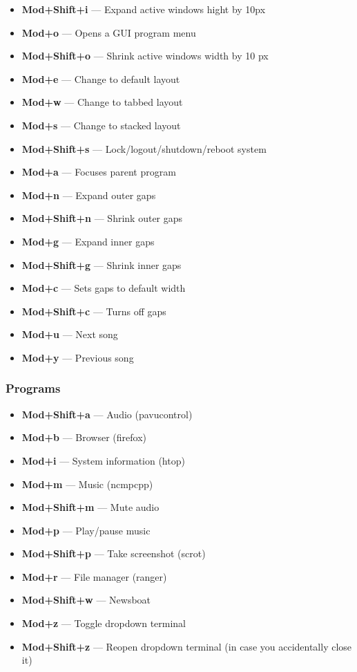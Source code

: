 \documentclass{article}
\begin{document}
\begin{itemize}
	\item \textbf{Mod+Shift+i} --- Expand active windows hight by 10px
	\item \textbf{Mod+o} --- Opens a GUI program menu
	\item \textbf{Mod+Shift+o} --- Shrink active windows width by 10 px
	\item \textbf{Mod+e} --- Change to default layout
	\item \textbf{Mod+w} --- Change to tabbed layout
	\item \textbf{Mod+s} --- Change to stacked layout
	\item \textbf{Mod+Shift+s} --- Lock/logout/shutdown/reboot system
	\item \textbf{Mod+a} --- Focuses parent program
	\item \textbf{Mod+n} --- Expand outer gaps
	\item \textbf{Mod+Shift+n} --- Shrink outer gaps
	\item \textbf{Mod+g} --- Expand inner gaps
	\item \textbf{Mod+Shift+g} --- Shrink inner gaps
	\item \textbf{Mod+c} --- Sets gaps to default width
	\item \textbf{Mod+Shift+c} --- Turns off gaps
	\item \textbf{Mod+u} --- Next song
	\item \textbf{Mod+y} --- Previous song
\end{itemize}

\subsubsection{Programs}
\begin{itemize}
	\item \textbf{Mod+Shift+a} --- Audio (pavucontrol)
	\item \textbf{Mod+b} --- Browser (firefox)
	\item \textbf{Mod+i} --- System information (htop)
	\item \textbf{Mod+m} --- Music (ncmpcpp)
	\item \textbf{Mod+Shift+m} --- Mute audio
	\item \textbf{Mod+p} --- Play/pause music
	\item \textbf{Mod+Shift+p} --- Take screenshot (scrot)
	\item \textbf{Mod+r} --- File manager (ranger)
	\item \textbf{Mod+Shift+w} --- Newsboat
	\item \textbf{Mod+z} --- Toggle dropdown terminal
	\item \textbf{Mod+Shift+z} --- Reopen dropdown terminal (in case you accidentally close it)
\end{itemize}
\end{document}
